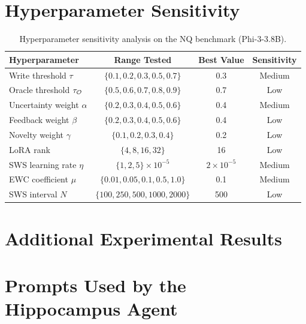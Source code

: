 \section{Hyperparameter Sensitivity}
\label{app:hyperparameters}

\begin{table}[h]
  \centering
  \caption{Hyperparameter sensitivity analysis on the NQ benchmark (Phi-3-3.8B).}
  \label{tab:hyperparameters}
  \small
  \begin{tabular}{@{}lccc@{}}
    \toprule
    \textbf{Hyperparameter} & \textbf{Range Tested} & \textbf{Best Value} & \textbf{Sensitivity} \\
    \midrule
    Write threshold $\tau$              & $\{0.1, 0.2, 0.3, 0.5, 0.7\}$ & 0.3 & Medium \\
    Oracle threshold $\tau_{\mathcal{O}}$     & $\{0.5, 0.6, 0.7, 0.8, 0.9\}$ & 0.7 & Low \\
    Uncertainty weight $\alpha$         & $\{0.2, 0.3, 0.4, 0.5, 0.6\}$ & 0.4 & Medium \\
    Feedback weight $\beta$             & $\{0.2, 0.3, 0.4, 0.5, 0.6\}$ & 0.4 & Low \\
    Novelty weight $\gamma$             & $\{0.1, 0.2, 0.3, 0.4\}$       & 0.2 & Low \\
    LoRA rank                           & $\{4, 8, 16, 32\}$             & 16  & Low \\
    SWS learning rate $\eta$            & $\{1, 2, 5\} \times 10^{-5}$   & $2 \times 10^{-5}$ & Medium \\
    EWC coefficient $\mu$               & $\{0.01, 0.05, 0.1, 0.5, 1.0\}$ & 0.1 & Medium \\
    SWS interval $N$                    & $\{100, 250, 500, 1000, 2000\}$ & 500 & Low \\
    \bottomrule
  \end{tabular}
\end{table}


\section{Additional Experimental Results}
\label{app:additional_results}


\section{Prompts Used by the Hippocampus Agent}
\label{app:prompts}

